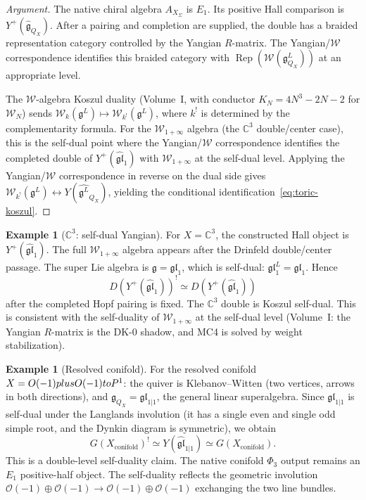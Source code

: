 \documentclass[11pt]{article}
\theoremstyle{definition}
\newtheorem{example}[theorem]{Example}
\theoremstyle{remark}
\DeclareMathOperator{\Rep}{Rep}
\newcommand{\fkg}{\mathfrak{g}}
\newcommand{\cO}{\mathcal{O}}
\newcommand{\cW}{\mathcal{W}}
\newcommand{\bC}{\mathbb{C}}
\begin{document}
\begin{proof}[Argument]
The native chiral algebra $A_{X_\Sigma}$ is $E_1$. Its positive Hall
comparison is $Y^+(\widehat{\fkg}_{Q_X})$. After a pairing and
completion are supplied, the double has a braided representation
category controlled by the Yangian $R$-matrix. The Yangian/$\cW$
correspondence identifies this braided category with
$\Rep(\cW(\fkg^L_{Q_X}))$ at an appropriate level.

The $\cW$-algebra Koszul duality (Volume~I, with conductor
$K_N = 4N^3 - 2N - 2$ for $\cW_N$) sends
$\cW_k(\fkg^L) \mapsto \cW_{k^!}(\fkg^L)$, where $k^!$ is
determined by the complementarity formula. For the $\cW_{1+\infty}$
algebra (the $\bC^3$ double/center case), this is the self-dual point
where the Yangian/$\cW$ correspondence identifies the completed double
of $Y^+(\widehat{\mathfrak{gl}}_1)$ with $\cW_{1+\infty}$ at the
self-dual level. Applying the Yangian/$\cW$ correspondence in reverse on the dual
side gives $\cW_{k^!}(\fkg^L) \leftrightarrow
Y(\widehat{\fkg^L}_{Q_X})$, yielding the
conditional identification~\eqref{eq:toric-koszul}.
\end{proof}

\begin{example}[$\bC^3$: self-dual Yangian]
\label{ex:c3-koszul}
For $X = \bC^3$, the constructed Hall object is
$Y^+(\widehat{\mathfrak{gl}}_1)$. The full $\cW_{1+\infty}$ algebra
appears after the Drinfeld double/center passage. The super Lie algebra is
$\fkg = \mathfrak{gl}_1$, which is self-dual:
$\mathfrak{gl}_1^L = \mathfrak{gl}_1$. Hence
\[
D(Y^+(\widehat{\mathfrak{gl}}_1))^!
\simeq D(Y^+(\widehat{\mathfrak{gl}}_1))
\]
after the completed Hopf pairing is fixed. The $\bC^3$ double is
Koszul self-dual.
This is consistent with the self-duality of $\cW_{1+\infty}$ at the
self-dual level (Volume~I: the Yangian $R$-matrix is the DK-0 shadow,
and MC4 is solved by weight stabilization).
\end{example}

\begin{example}[Resolved conifold]
\label{ex:conifold-koszul}
For the resolved conifold $X = \cO(-1) \oplus \cO(-1) \to \bP^1$:
the quiver is Klebanov--Witten (two vertices, arrows in both
directions), and $\fkg_{Q_X} = \mathfrak{gl}_{1|1}$, the general
linear superalgebra. Since $\mathfrak{gl}_{1|1}$ is self-dual
under the Langlands involution (it has a single even and single odd
simple root, and the Dynkin diagram is symmetric), we obtain
\[
G(X_{\mathrm{conifold}})^! \simeq
Y(\widehat{\mathfrak{gl}}_{1|1}) \simeq G(X_{\mathrm{conifold}}).
\]
This is a double-level self-duality claim. The native conifold
$\Phi_3$ output remains an $E_1$ positive-half object.
The self-duality reflects the geometric involution
$\cO(-1) \oplus \cO(-1) \to \cO(-1) \oplus \cO(-1)$ exchanging the
two line bundles.
\end{example}
\end{document}
